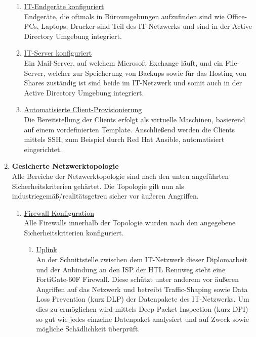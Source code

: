 \documentclass[
	headings=optiontotocandhead,%
	oneside,
	numbers=noenddot,%
	toc=flat, %
	10pt, %
	parskip=full, %
	listof=totoc, %
	listof=flat, %
	numbers=noenddot, %
	bibliography=totoc, %
	a4paper,DIV=14,
]{scrartcl}
\begin{document}
\begin{enumerate}[start=1,label={\bfseries Ziel-H \arabic*},leftmargin=*,wide]
\begin{enumerate}[label=\alph*.]
\item{\underline{IT-Endgeräte konfiguriert}}\\
Endgeräte, die oftmals in Büroumgebungen aufzufinden sind wie Office-PCs, Laptops, Drucker sind Teil des IT-Netzwerks und sind in der Active Directory Umgebung integriert.

\item{\underline{IT-Server konfiguriert}}\\
Ein Mail-Server, auf welchem Microsoft Exchange läuft, und ein File-Server, welcher zur Speicherung von Backups sowie für das Hosting von Shares zuständig ist sind beide im IT-Netzwerk und somit auch in der Active Directory Umgebung integriert.

\item{\underline{Automatisierte Client-Provisionierung}}\\
Die Bereitstellung der Clients erfolgt als virtuelle Maschinen, basierend auf einem vordefinierten Template. Anschließend werden die Clients mittels SSH, zum Beispiel durch Red Hat Ansible, automatisiert eingerichtet.

\end{enumerate}
\item{\bfseries{Gesicherte Netzwerktopologie}}\\
Alle Bereiche der Netzwerktopologie sind nach den unten angeführten Sicherheitskriterien gehärtet. Die Topologie gilt nun als industriegemäß/realitätsgetreu sicher vor äußeren Angriffen.

\begin{enumerate}[label=\alph*.]
\item{\underline{Firewall Konfiguration}}\\
Alle Firewalls innerhalb der Topologie wurden nach den angegebene Sicherheitskriterien konfiguriert. 

\begin{enumerate}[label=\roman*.]
\item{\underline{Uplink}}\\
An der Schnittstelle zwischen dem IT-Netzwerk dieser Diplomarbeit und der Anbindung an den ISP der HTL Rennweg steht eine FortiGate-60F Firewall. Diese schützt unter anderem vor äußeren Angriffen auf das Netzwerk und betreibt Traffic-Shaping sowie Data Loss Prevention (kurz DLP) der Datenpakete des IT-Netzwerks. Um dies zu ermöglichen wird mittels Deep Packet Inspection (kurz DPI) so gut wie jedes einzelne Datenpaket analysiert und auf Zweck sowie mögliche Schädlichkeit überprüft.


\end{enumerate}
\end{enumerate}
\end{enumerate}
\end{document}
